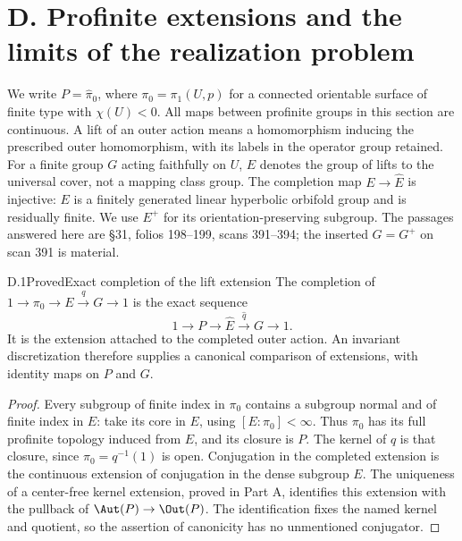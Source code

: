 \section{D. Profinite extensions and the limits of the realization problem}

We write $P=\widehat\pi_0$, where $\pi_0=\pi_1(U,p)$ for a connected orientable surface of finite type with $\chi(U)<0$. All maps between profinite groups in this section are continuous. A lift of an outer action means a homomorphism inducing the prescribed outer homomorphism, with its labels in the operator group retained. For a finite group $G$ acting faithfully on $U$, $E$ denotes the group of lifts to the universal cover, not a mapping class group. The completion map $E\to\widehat E$ is injective: $E$ is a finitely generated linear hyperbolic orbifold group and is residually finite. We use $E^+$ for its orientation-preserving subgroup. The passages answered here are \S31, folios 198--199, scans 391--394; the inserted $G=G^+$ on scan 391 is material.

\begin{claim}{D.1}{Proved}{Exact completion of the lift extension}
The completion of $1\to\pi_0\to E\xrightarrow qG\to1$ is the exact sequence
\[
1\longrightarrow P\longrightarrow\widehat E\xrightarrow{\widehat q}G\longrightarrow1.
\]
It is the extension attached to the completed outer action. An invariant discretization therefore supplies a canonical comparison of extensions, with identity maps on $P$ and $G$.
\end{claim}
\begin{proof}
Every subgroup of finite index in $\pi_0$ contains a subgroup normal and of finite index in $E$: take its core in $E$, using $[E:\pi_0]<\infty$. Thus $\pi_0$ has its full profinite topology induced from $E$, and its closure is $P$. The kernel of $\widehat q$ is that closure, since $\pi_0=q^{-1}(1)$ is open. Conjugation in the completed extension is the continuous extension of conjugation in the dense subgroup $E$. The uniqueness of a center-free kernel extension, proved in Part A, identifies this extension with the pullback of $\Aut(P)\to\Out(P)$. The identification fixes the named kernel and quotient, so the assertion of canonicity has no unmentioned conjugator.
\end{proof}

